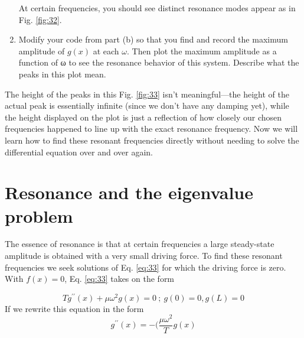 \begin{problem}
\begin{enumerate}[label=(\alph*)]
\begin{lstlisting}
\end{lstlisting}
At certain frequencies, you should see distinct resonance modes appear as in Fig. \ref{fig:32}.
\item Modify your code from part (b) so that you find and record the maximum amplitude of $g(x)$ at each $\omega$. Then plot the maximum amplitude
as a function of ω to see the resonance behavior of this system. Describe what the peaks in this plot mean.
				
				
\end{enumerate}
\end{problem}

				The height of the peaks in this Fig. \ref{fig:33} isn\rq t meaningful—the height of the
actual peak is essentially infinite (since we don’t have any damping yet), while
the height displayed on the plot is just a reflection of how closely our chosen
frequencies happened to line up with the exact resonance frequency. Now we will
learn how to find these resonant frequencies directly without needing to solve
the differential equation over and over again.

\section*{Resonance and the eigenvalue problem}
The essence of resonance is that at certain frequencies a large steady-state amplitude is obtained with a very small driving force. To find these resonant frequencies
we seek solutions of Eq. \ref{eq:33} for which the driving force is zero. With $f(x) = 0$,
Eq. \ref{eq:33} takes on the form

\begin{equation}\label{eq:35}
		Tg^{\prime\prime}(x) + \mu \omega ^ 2 g(x) = 0 \ ; \ g(0) = 0, g(L) = 0
				\end{equation}
				If we rewrite this equation in the form
				\begin{equation}\label{eq:36}
		g^{\prime\prime}(x) = - (\frac{\mu \omega^2}{T}g(x)
				\end{equation}
				

